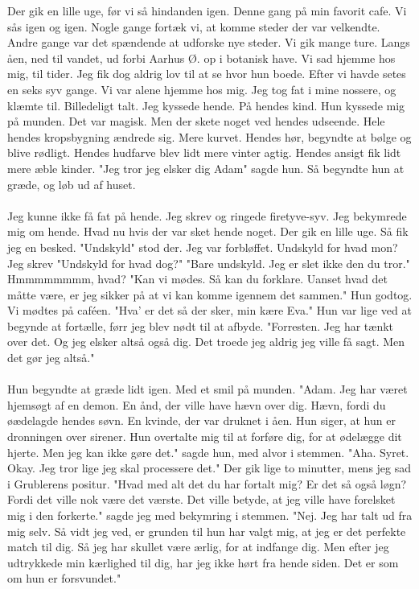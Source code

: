 \documentclass[]{article}
\begin{document}
Der gik en lille uge, før vi så hindanden igen. Denne gang på min favorit cafe. Vi sås igen og igen. Nogle gange fortæk vi, at komme steder der var velkendte. Andre gange var det spændende at udforske nye steder. Vi gik mange ture. Langs åen, ned til vandet, ud forbi Aarhus Ø. op i botanisk have. Vi sad hjemme hos mig, til tider. Jeg fik dog aldrig lov til at se hvor hun boede. Efter vi havde setes en seks syv gange. Vi var alene hjemme hos mig. Jeg tog fat i mine nossere, og klæmte til. Billedeligt talt. Jeg kyssede hende. På hendes kind. Hun kyssede mig på munden. Det var magisk. Men der skete noget ved hendes udseende. Hele hendes kropsbygning ændrede sig. Mere kurvet. Hendes hør, begyndte at bølge og blive rødligt. Hendes hudfarve blev lidt mere vinter agtig. Hendes ansigt fik lidt mere æble kinder. "Jeg tror jeg elsker dig Adam" sagde hun. Så begyndte hun at græde, og løb ud af huset. 
\\ \\
Jeg kunne ikke få fat på hende. Jeg skrev og ringede firetyve-syv. Jeg bekymrede mig om hende. Hvad nu hvis der var sket hende noget. Der gik en lille uge. Så fik jeg en besked. "Undskyld" stod der. Jeg var forbløffet. Undskyld for hvad mon? Jeg skrev "Undskyld for hvad dog?" "Bare undskyld. Jeg er slet ikke den du tror." Hmmmmmmmm, hvad? "Kan vi mødes. Så kan du forklare. Uanset hvad det måtte være, er jeg sikker på at vi kan komme igennem det sammen." Hun godtog. Vi mødtes på caféen. "Hva' er det så der sker, min kære Eva." Hun var lige ved at begynde at fortælle, førr jeg blev nødt til at afbyde. "Forresten. Jeg har tænkt over det. Og jeg elsker altså også dig. Det troede jeg aldrig jeg ville få sagt. Men det gør jeg altså."
\\ \\
Hun begyndte at græde lidt igen. Med et smil på munden. "Adam. Jeg har været hjemsøgt af en demon. En ånd, der ville have hævn over dig. Hævn, fordi du øædelagde hendes søvn. En kvinde, der var druknet i åen. Hun siger, at hun er dronningen over sirener. Hun overtalte mig til at forføre dig, for at ødelægge dit hjerte. Men jeg kan ikke gøre det." sagde hun, med alvor i stemmen. "Aha. Syret. Okay. Jeg tror lige jeg skal processere det." Der gik lige to minutter, mens jeg sad i Grublerens positur. "Hvad med alt det du har fortalt mig? Er det så også løgn? Fordi det ville nok være det værste. Det ville betyde, at jeg ville have forelsket mig i den forkerte." sagde jeg med bekymring i stemmen. "Nej. Jeg har talt ud fra mig selv. Så vidt jeg ved, er grunden til hun har valgt mig, at jeg er det perfekte match til dig. Så jeg har skullet være ærlig, for at indfange dig. Men efter jeg udtrykkede min kærlighed til dig, har jeg ikke hørt fra hende siden. Det er som om hun er forsvundet."
\end{document}
